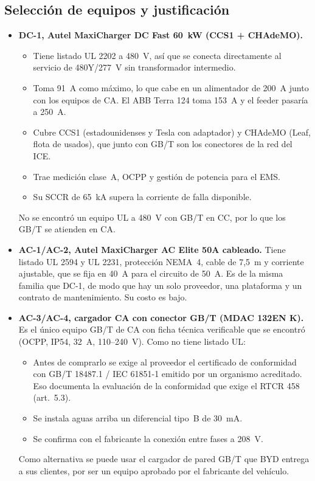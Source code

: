 \subsection{Selección de equipos y justificación}
\label{sec:seleccion}
\begin{itemize}
\item \textbf{DC-1, Autel MaxiCharger DC Fast 60~kW (CCS1 + CHAdeMO).}
  \begin{itemize}
  \item Tiene listado UL 2202 a 480~V, así que se conecta directamente al servicio de 480Y/277~V sin transformador intermedio.
  \item Toma 91~A como máximo, lo que cabe en un alimentador de 200~A junto con los equipos de CA. El ABB Terra 124 toma 153~A y el feeder pasaría a 250~A.
  \item Cubre CCS1 (estadounidenses y Tesla con adaptador) y CHAdeMO (Leaf, flota de usados), que junto con GB/T son los conectores de la red del ICE.
  \item Trae medición clase~A, OCPP y gestión de potencia para el EMS.
  \item Su SCCR de 65~kA supera la corriente de falla disponible.
  \end{itemize}
  No se encontró un equipo UL a 480~V con GB/T en CC, por lo que los GB/T se atienden en CA.
\item \textbf{AC-1/AC-2, Autel MaxiCharger AC Elite 50A cableado.} Tiene listado UL 2594 y UL 2231, protección NEMA~4, cable de 7,5~m y corriente ajustable, que se fija en 40~A para el circuito de 50~A. Es de la misma familia que DC-1, de modo que hay un solo proveedor, una plataforma y un contrato de mantenimiento. Su costo es bajo.
\item \textbf{AC-3/AC-4, cargador CA con conector GB/T (MDAC 132EN K).} Es el único equipo GB/T de CA con ficha técnica verificable que se encontró (OCPP, IP54, 32~A, 110--240~V). Como no tiene listado UL:
  \begin{itemize}
  \item Antes de comprarlo se exige al proveedor el certificado de conformidad con GB/T 18487.1 / IEC 61851-1 emitido por un organismo acreditado. Eso documenta la evaluación de la conformidad que exige el RTCR 458 (art.~5.3).
  \item Se instala aguas arriba un diferencial tipo~B de 30~mA.
  \item Se confirma con el fabricante la conexión entre fases a 208~V.
  \end{itemize}
  Como alternativa se puede usar el cargador de pared GB/T que BYD entrega a sus clientes, por ser un equipo aprobado por el fabricante del vehículo.

\end{itemize}
